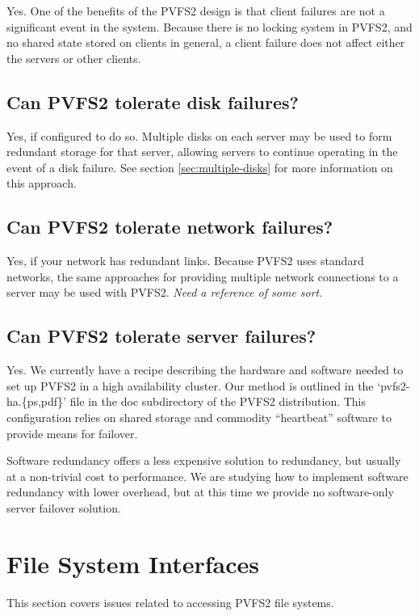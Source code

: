 \documentclass[11pt,letterpaper]{article}
\begin{document}
Yes.  One of the benefits of the PVFS2 design is that client failures are not a
significant event in the system.  Because there is no locking system in PVFS2,
and no shared state stored on clients in general, a client failure does not
affect either the servers or other clients.

\subsection{Can PVFS2 tolerate disk failures?}

Yes, if configured to do so.  Multiple disks on each server may be used to
form redundant storage for that server, allowing servers to continue operating
in the event of a disk failure.  See section \ref{sec:multiple-disks} for more
information on this approach.

\subsection{Can PVFS2 tolerate network failures?}

Yes, if your network has redundant links.  Because PVFS2 uses standard
networks, the same approaches for providing multiple network connections to a
server may be used with PVFS2.  \emph{Need a reference of some sort.}

\subsection{Can PVFS2 tolerate server failures?}

Yes.  We currently have a recipe describing the hardware and software
needed to set up PVFS2 in a high availability cluster.  Our method is
outlined in the `pvfs2-ha.\{ps,pdf\}' file in the doc subdirectory of the
PVFS2 distribution.  This configuration relies on shared storage and
commodity ``heartbeat'' software to provide means for failover.

Software redundancy offers a less expensive solution to redundancy,
but usually at a non-trivial cost to performance.  We are studying how
to implement software redundancy with lower overhead, but at this time
we provide no software-only server failover solution.

%
%
\section{File System Interfaces}

This section covers issues related to accessing PVFS2 file systems.
\end{document}
